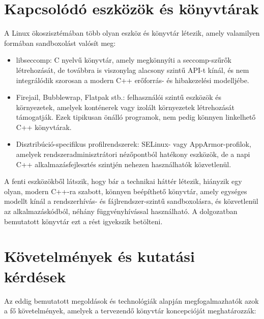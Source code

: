 \section{Kapcsolódó eszközök és könyvtárak}

A Linux ökoszisztémában több olyan eszköz és könyvtár létezik, amely valamilyen
formában sandboxolást valósít meg:

\begin{itemize}
  \item libseccomp: C nyelvű könyvtár, amely megkönnyíti a
        seccomp-szűrők létrehozását, de továbbra is viszonylag alacsony szintű
        API-t kínál, és nem integrálódik szorosan a modern C++ erőforrás- és
        hibakezelési modelljébe.
  \item Firejail, Bubblewrap, Flatpak stb.: felhasználói szintű
        eszközök és környezetek, amelyek konténerek vagy izolált környezetek
        létrehozását támogatják. Ezek tipikusan önálló programok, nem pedig
        könnyen linkelhető C++ könyvtárak.
  \item Disztribúció-specifikus profilrendszerek: SELinux- vagy
        AppArmor-profilok, amelyek rendszeradminisztrátori nézőpontból hatékony
        eszközök, de a napi C++ alkalmazásfejlesztés szintjén nehezen
        használhatók közvetlenül.
\end{itemize}

A fenti eszközökből látszik, hogy bár a technikai háttér létezik, hiányzik egy
olyan, modern C++-ra szabott, könnyen beépíthető könyvtár, amely egységes
modellt kínál a rendszerhívás- és fájlrendszer-szintű sandboxolásra, és közvetlenül
az alkalmazáskódból, néhány függvényhívással használható. A dolgozatban
bemutatott könyvtár ezt a rést igyekszik betölteni.


\section{Követelmények és kutatási kérdések}

Az eddig bemutatott megoldások és technológiák alapján megfogalmazhatók azok a
fő követelmények, amelyek a tervezendő könyvtár koncepcióját meghatározzák:

